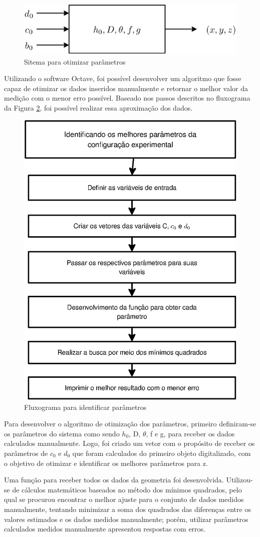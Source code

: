 \documentclass[a4paper, 12pt]{article}
\begin{document}
\begin{figure}[h!]
	\centering
		\includegraphics[width=.55\linewidth]{sitema_otimizacao.eps}
	\caption{Sitema para otimizar parâmetros}
	\label{sitema_otimizacao}
\end{figure}

Utilizando o software Octave, foi possível desenvolver um algoritmo que fosse capaz de otimizar os dados inseridos manualmente e retornar o melhor valor da medição com o menor erro possível. Baseado nos passos descritos no fluxograma da Figura \ref{identificar parametros}, foi possível realizar essa aproximação dos dados.


\begin{figure}[h!]
	\centering
		\includegraphics[width=.55\linewidth]{fluxograma_identificar_parametros.eps}
	\caption{Fluxograma para identificar parâmetros}
	\label{identificar parametros}
\end{figure}

Para desenvolver o algoritmo de otimização dos parâmetros, primeiro definiram-se os parâmetros do sistema como sendo $h_0$, D, $\theta$, f e g, para receber os dados calculados manualmente. Logo, foi criado um vetor com o propósito de receber os parâmetros de $c_0$ e $d_0$ que foram calculados do primeiro objeto digitalizado, com o objetivo de otimizar e identificar os melhores parâmetros para z.

Uma função para receber todos os dados da geometria foi desenvolvida. Utilizou-se de cálculos matemáticos baseados no método dos mínimos quadrados, pelo qual se procurou encontrar o melhor ajuste para o conjunto de dados medidos manualmente, tentando minimizar a soma dos quadrados das diferenças entre os valores estimados e os dados medidos manualmente; porém, utilizar parâmetros calculados medidos manualmente apresentou respostas com erros.
\end{document}
